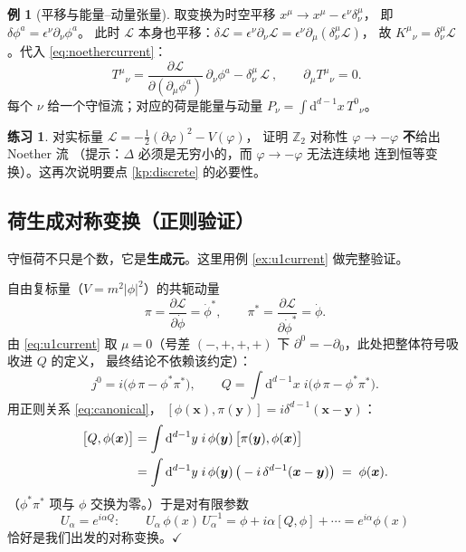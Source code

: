 \documentclass[UTF8,a4paper,11pt]{ctexart}
\theoremstyle{plain}
\theoremstyle{definition}
\newtheorem{example}{例}[section]
\newtheorem{exercise}{练习}[section]
\theoremstyle{remark}
\newcommand{\ext}{\mathrm{d}}          %
\newcommand{\ZZ}{\mathbb{Z}}
\newcommand{\Lag}{\mathcal{L}}
\newcommand{\PD}[2]{\frac{\partial #1}{\partial #2}}
\newcommand{\Uop}{U}
\begin{document}
\begin{example}[平移与能量--动量张量]
\label{ex:stress}
取变换为时空平移 $x^\mu\to x^\mu-\epsilon^\nu\delta^\mu_\nu$，
即 $\delta\phi^a=\epsilon^\nu\partial_\nu\phi^a$。
此时 $\Lag$ 本身也平移：$\delta\Lag=\epsilon^\nu\partial_\nu\Lag
=\epsilon^\nu\partial_\mu(\delta^\mu_\nu\Lag)$，
故 $K^\mu{}_\nu=\delta^\mu_\nu\Lag$。代入 \eqref{eq:noethercurrent}：
\begin{equation}
  \boxed{\ T^\mu{}_\nu
  =\PD{\Lag}{(\partial_\mu\phi^a)}\,\partial_\nu\phi^a
  -\delta^\mu_\nu\,\Lag\ },
  \qquad
  \partial_\mu T^\mu{}_\nu=0 .
  \label{eq:stresstensor}
\end{equation}
每个 $\nu$ 给一个守恒流；对应的荷是能量与动量
$P_\nu=\int \ext^{d-1}x\,T^0{}_\nu$。
\end{example}

\begin{exercise}
对实标量 $\Lag=-\tfrac12(\partial\varphi)^2-V(\varphi)$，
证明 $\ZZ_2$ 对称性 $\varphi\to-\varphi$ \textbf{不}给出 Noether 流
（提示：$\Delta$ 必须是无穷小的，而 $\varphi\to-\varphi$ 无法连续地
连到恒等变换）。这再次说明要点 \ref{kp:discrete} 的必要性。
\end{exercise}

\subsection{荷生成对称变换（正则验证）}
\label{subsec:generates}

守恒荷不只是个数，它是\textbf{生成元}。这里用例
\ref{ex:u1current} 做完整验证。

自由复标量（$V=m^2|\phi|^2$）的共轭动量
\begin{equation}
  \pi=\PD{\Lag}{\dot\phi}=\dot\phi^*,
  \qquad
  \pi^*=\PD{\Lag}{\dot\phi^*}=\dot\phi .
\end{equation}
由 \eqref{eq:u1current} 取 $\mu=0$（号差 $(-,+,+,+)$ 下
$\partial^0=-\partial_0$，此处把整体符号吸收进 $Q$ 的定义，
最终结论不依赖该约定）：
\begin{equation}
  j^0=i\big(\phi\,\pi-\phi^*\pi^*\big),
  \qquad
  Q=\int \ext^{d-1}x\;i\big(\phi\,\pi-\phi^*\pi^*\big).
  \label{eq:Qcanonical}
\end{equation}
用正则关系 \eqref{eq:canonical}，
$[\phi(\bm x),\pi(\bm y)]=i\delta^{d-1}(\bm x-\bm y)$：
\begin{align}
  \big[Q,\phi(\bm x)\big]
  &=\int \ext^{d-1}y\;i\,\phi(\bm y)\,
    \big[\pi(\bm y),\phi(\bm x)\big]
  \notag\\
  &=\int \ext^{d-1}y\;i\,\phi(\bm y)\,
    \big(-i\,\delta^{d-1}(\bm x-\bm y)\big)
  \;=\;\phi(\bm x).
  \label{eq:Qphi}
\end{align}
（$\phi^*\pi^*$ 项与 $\phi$ 交换为零。）于是对有限参数
\begin{equation}
  \boxed{\ \Uop_\alpha=e^{i\alpha Q}:
  \qquad
  \Uop_\alpha\,\phi(x)\,\Uop_\alpha^{-1}
  =\phi+i\alpha[Q,\phi]+\cdots
  =e^{i\alpha}\phi(x)\ }
  \label{eq:Uacts}
\end{equation}
恰好是我们出发的对称变换。$\checkmark$
\end{document}
